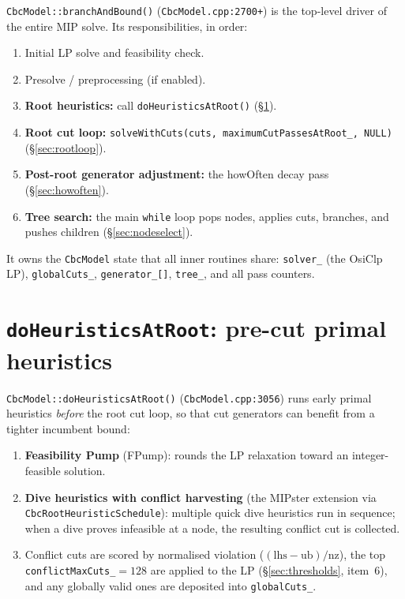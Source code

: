 \documentclass[11pt,a4paper]{article}
\begin{document}
\texttt{CbcModel::branchAndBound()} (\texttt{CbcModel.cpp:2700+})
is the top-level driver of the entire MIP solve.  Its
responsibilities, in order:

\begin{enumerate}[leftmargin=*]
  \item Initial LP solve and feasibility check.
  \item Presolve / preprocessing (if enabled).
  \item \textbf{Root heuristics:} call
        \texttt{doHeuristicsAtRoot()} (\S\ref{sec:heurroot}).
  \item \textbf{Root cut loop:}
        \texttt{solveWithCuts(cuts, maximumCutPassesAtRoot\_, NULL)}
        (\S\ref{sec:rootloop}).
  \item \textbf{Post-root generator adjustment:} the howOften decay
        pass (\S\ref{sec:howoften}).
  \item \textbf{Tree search:} the main \texttt{while} loop pops
        nodes, applies cuts, branches, and pushes children
        (\S\ref{sec:nodeselect}).
\end{enumerate}

It owns the \texttt{CbcModel} state that all inner routines share:
\texttt{solver\_} (the OsiClp LP), \texttt{globalCuts\_},
\texttt{generator\_[]}, \texttt{tree\_}, and all pass counters.

\section{\texttt{doHeuristicsAtRoot}: pre-cut primal heuristics}
\label{sec:heurroot}

\texttt{CbcModel::doHeuristicsAtRoot()}
(\texttt{CbcModel.cpp:3056}) runs early primal heuristics
\emph{before} the root cut loop, so that cut generators can benefit
from a tighter incumbent bound:

\begin{enumerate}[leftmargin=*]
  \item \textbf{Feasibility Pump} (FPump): rounds the LP
        relaxation toward an integer-feasible solution.
  \item \textbf{Dive heuristics with conflict harvesting}
        (the MIPster extension via
        \texttt{CbcRootHeuristicSchedule}): multiple quick dive
        heuristics run in sequence; when a dive proves infeasible
        at a node, the resulting conflict cut is collected.
  \item Conflict cuts are scored by normalised violation
        ($(\text{lhs}-\text{ub})/\text{nz}$), the top
        \texttt{conflictMaxCuts\_}$=128$ are applied to the LP
        (\S\ref{sec:thresholds}, item~6), and any globally valid
        ones are deposited into \texttt{globalCuts\_}.
\end{enumerate}
\end{document}
